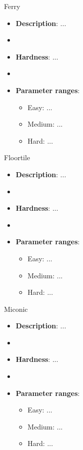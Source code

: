\documentclass[aspectratio=169,xcolor=dvipsnames]{beamer}
\begin{document}
\begin{frame}{Ferry}

    \begin{itemize}
        \item \textbf{Description}: ...
        \item[]
        \item \textbf{Hardness}: ...
        \item[]
        \item \textbf{Parameter ranges}:
        \begin{itemize}
            \item Easy: ...
            \item Medium: ...
            \item Hard: ...
        \end{itemize}
    \end{itemize}

\end{frame}


\begin{frame}{Floortile}

    \begin{itemize}
        \item \textbf{Description}: ...
        \item[]
        \item \textbf{Hardness}: ...
        \item[]
        \item \textbf{Parameter ranges}:
        \begin{itemize}
            \item Easy: ...
            \item Medium: ...
            \item Hard: ...
        \end{itemize}
    \end{itemize}

\end{frame}


\begin{frame}{Miconic}

    \begin{itemize}
        \item \textbf{Description}: ...
        \item[]
        \item \textbf{Hardness}: ...
        \item[]
        \item \textbf{Parameter ranges}:
        \begin{itemize}
            \item Easy: ...
            \item Medium: ...
            \item Hard: ...
        \end{itemize}
    \end{itemize}

\end{frame}
\end{document}
